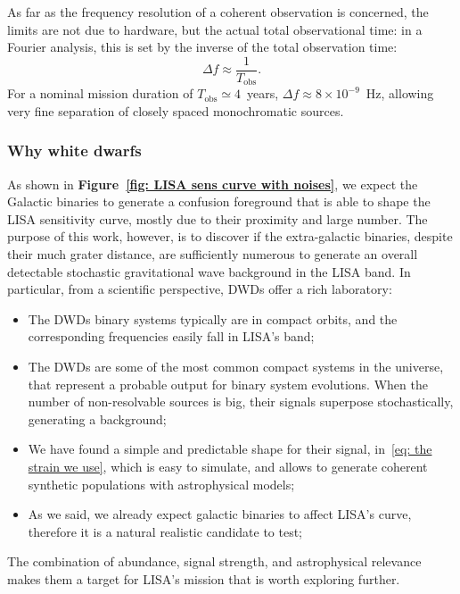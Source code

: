 As far as the frequency resolution of a coherent observation is concerned, the limits are not due to hardware, but the actual total observational time: in a Fourier analysis, this is set by the inverse of the total observation time:  
\begin{equation}
\Delta f \approx \frac{1}{T_{\mathrm{obs}}}.
\end{equation}
For a nominal mission duration of $T_{\mathrm{obs}} \simeq 4$~years, $\Delta f \approx 8\times 10^{-9}$~Hz, allowing very fine separation of closely spaced monochromatic sources.

\subsubsection{Why white dwarfs}
As shown in \textbf{Figure~\ref{fig: LISA sens curve with noises}}, we expect the Galactic binaries to generate a confusion foreground that is able to shape the LISA sensitivity curve, mostly due to their proximity and large number.
The purpose of this work, however, is to discover if the extra-galactic binaries, despite their much grater distance, are sufficiently numerous to generate an overall detectable stochastic gravitational wave background in the LISA band.
In particular, from a scientific perspective, DWDs offer a rich laboratory:  
\begin{itemize}
    \item The DWDs binary systems typically are in compact orbits, and the corresponding frequencies easily fall in LISA's band; 
    \item The DWDs are some of the most common compact systems in the universe, that represent a probable output for binary system evolutions. 
    When the number of non-resolvable sources is big, their signals superpose stochastically, generating a background; 
    \item We have found a simple and predictable shape for their signal, in~\eqref{eq: the strain we use}, which is easy to simulate, and allows to generate coherent synthetic populations with astrophysical models; 
    \item As we said, we already expect galactic binaries to affect LISA's curve, therefore it is a natural realistic candidate to test;
\end{itemize}
The combination of abundance, signal strength, and astrophysical relevance makes them a target for LISA’s mission that is worth exploring further.

